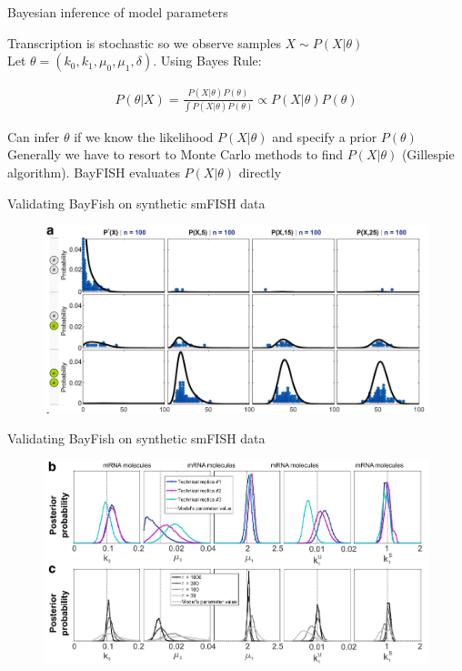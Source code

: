 \documentclass[aspectratio=1610]{beamer}					%
\begin{document}
\begin{frame}{Bayesian inference of model parameters}

Transcription is stochastic so we observe samples $X \sim P(X|\theta)$\\
\vspace{0.2in}
Let $\theta = \left(k_{0},k_{1},\mu_{0},\mu_{1},\delta\right)$. Using Bayes Rule: 

\begin{align*}
P(\theta|X) = \frac{P(X|\theta)P(\theta)}{\int P(X|\theta)P(\theta)} \propto P(X|\theta)P(\theta)
\end{align*}

Can infer $\theta$ if we know the likelihood $P(X|\theta)$ and specify a prior $P(\theta)$\\
\vspace{0.2in}
Generally we have to resort to Monte Carlo methods to find $P(X|\theta)$ (Gillespie algorithm). BayFISH evaluates $P(X|\theta)$ directly

\end{frame}

\begin{frame}{Validating BayFish on synthetic smFISH data}

\begin{figure}
\includegraphics[width=14cm]{figure-3a.png}
\end{figure}

\end{frame}

\begin{frame}{Validating BayFish on synthetic smFISH data}

\begin{figure}
\includegraphics[width=14cm]{figure-3b.png}
\end{figure}

\end{frame}
\end{document}
